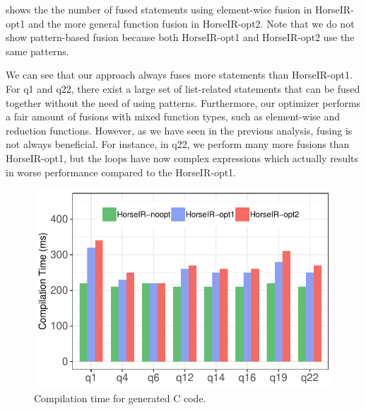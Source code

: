  shows the the number of fused statements using
element-wise fusion in HorseIR-opt1 and the more general function fusion in
HorseIR-opt2.  Note that we do not show pattern-based fusion because both
HorseIR-opt1 and HorseIR-opt2 use the same patterns. 

We can see that our approach always fuses more statements than HorseIR-opt1.
For q1 and q22, there exist a large set of list-related statements that can be
fused together without the need of using patterns.  Furthermore, our optimizer
performs a fair amount of fusions with mixed function types, such as
element-wise and reduction functions.
However, as we have seen in the previous analysis, fusing is not always
beneficial. For instance, in q22, we perform many more fusions than
HorseIR-opt1, but the loops have now complex expressions which actually results
in worse performance compared to the HorseIR-opt1. 

\begin{figure}[htbp]
\centering
\includegraphics[width=.9\columnwidth]{./src/figure/compile-time.pdf}
\caption{Compilation time for generated C code.}
\label{fig:compilation_time}
\end{figure}



